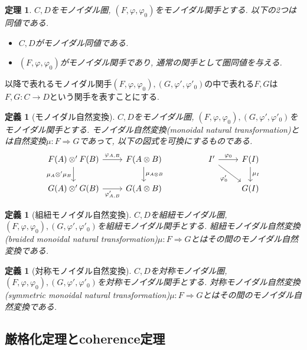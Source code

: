 \documentclass[a4paper,12pt]{ltjsarticle}
\theoremstyle{break}
\newtheorem{defn}[thm]{定義}
\newtheorem{thrm}[thm]{定理}
\newcommand{\vp}{\varphi}
\newcommand{\ra}{\Rightarrow}
\newcommand{\ot}{\otimes}
\numberwithin{equation}{section}
\begin{document}
\begin{thrm}
  $C,D$をモノイダル圏, $(F,\vp,\vp_0)$をモノイダル関手とする. 以下の2つは同値である. 
  \begin{itemize}
    \item $C,D$がモノイダル同値である. 
    \item $(F,\vp,\vp_0)$がモノイダル関手であり, 通常の関手として圏同値を与える. 
  \end{itemize}
\end{thrm}

以降で表れるモノイダル関手$(F,\vp,\vp_0),(G,\vp',\vp'_0)$の中で表れる$F,G$は$F,G: C \to D$という関手を表すことにする.

\begin{defn}[モノイダル自然変換]
  $C,D$をモノイダル圏, $(F,\vp,\vp_0),(G,\vp',\vp'_0)$をモノイダル関手とする. 
  モノイダル自然変換(monoidal natural transformation)とは自然変換$\mu: F \ra G$であって, 以下の図式を可換にするものである. 
  \[\begin{tikzcd}
    {F(A) \ot' F(B)} & {F(A \ot B)} && {I'} & {F(I)} \\
    {G(A) \ot' G(B)} & {G(A \ot B)} &&& {G(I)}
    \arrow["{\mu_A \ot' \mu_B}"', from=1-1, to=2-1]
    \arrow["{\vp_{A,B}}", from=1-1, to=1-2]
    \arrow["{\mu_{A \ot B}}", from=1-2, to=2-2]
    \arrow["{\vp_{A,B}'}"', from=2-1, to=2-2]
    \arrow["{\vp_0}", from=1-4, to=1-5]
    \arrow["{\mu_I}", from=1-5, to=2-5]
    \arrow["{\vp_0'}"', from=1-4, to=2-5]
  \end{tikzcd}\]
\end{defn}

\begin{defn}[組紐モノイダル自然変換]
  $C,D$を組紐モノイダル圏, $(F,\vp,\vp_0),(G,\vp',\vp'_0)$を組紐モノイダル関手とする.  
  組紐モノイダル自然変換(braided monoidal natural transformation)$\mu: F \ra G$とはその間のモノイダル自然変換である. 
\end{defn}

\begin{defn}[対称モノイダル自然変換]
  $C,D$を対称モノイダル圏, $(F,\vp,\vp_0),(G,\vp',\vp'_0)$を対称モノイダル関手とする.  
  対称モノイダル自然変換(symmetric monoidal natural transformation)$\mu: F \ra G$とはその間のモノイダル自然変換である. 
\end{defn}

\subsection{厳格化定理とcoherence定理}
\end{document}
